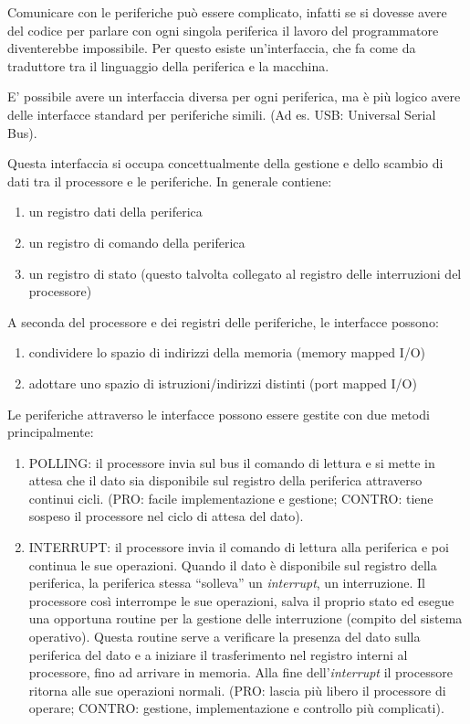 \documentclass[
  paper=a4,
  oneside  ,captions=tableheading
]{scrbook}
\providecommand{\tightlist}{%
  \setlength{\itemsep}{0pt}\setlength{\parskip}{0pt}}
\begin{document}
Comunicare con le periferiche può essere complicato, infatti se si
dovesse avere del codice per parlare con ogni singola periferica il
lavoro del programmatore diventerebbe impossibile. Per questo esiste
un'interfaccia, che fa come da traduttore tra il linguaggio della
periferica e la macchina.

E' possibile avere un interfaccia diversa per ogni periferica, ma è più
logico avere delle interfacce standard per periferiche simili. (Ad es.
USB: Universal Serial Bus).

Questa interfaccia si occupa concettualmente della gestione e dello
scambio di dati tra il processore e le periferiche. In generale
contiene:

\begin{enumerate}
\def\labelenumi{\arabic{enumi}.}
\tightlist
\item
  un registro dati della periferica
\item
  un registro di comando della periferica
\item
  un registro di stato (questo talvolta collegato al registro delle
  interruzioni del processore)
\end{enumerate}

A seconda del processore e dei registri delle periferiche, le interfacce
possono:

\begin{enumerate}
\def\labelenumi{\arabic{enumi}.}
\tightlist
\item
  condividere lo spazio di indirizzi della memoria (memory mapped I/O)
\item
  adottare uno spazio di istruzioni/indirizzi distinti (port mapped I/O)
\end{enumerate}

Le periferiche attraverso le interfacce possono essere gestite con due
metodi principalmente:

\begin{enumerate}
\def\labelenumi{\arabic{enumi}.}
\tightlist
\item
  POLLING: il processore invia sul bus il comando di lettura e si mette
  in attesa che il dato sia disponibile sul registro della periferica
  attraverso continui cicli. (PRO: facile implementazione e gestione;
  CONTRO: tiene sospeso il processore nel ciclo di attesa del dato).
\item
  INTERRUPT: il processore invia il comando di lettura alla periferica e
  poi continua le sue operazioni. Quando il dato è disponibile sul
  registro della periferica, la periferica stessa ``solleva'' un
  \emph{interrupt}, un interruzione. Il processore così interrompe le
  sue operazioni, salva il proprio stato ed esegue una opportuna routine
  per la gestione delle interruzione (compito del sistema operativo).
  Questa routine serve a verificare la presenza del dato sulla
  periferica del dato e a iniziare il trasferimento nel registro interni
  al processore, fino ad arrivare in memoria. Alla fine
  dell'\emph{interrupt} il processore ritorna alle sue operazioni
  normali. (PRO: lascia più libero il processore di operare; CONTRO:
  gestione, implementazione e controllo più complicati).
\end{enumerate}
\end{document}
